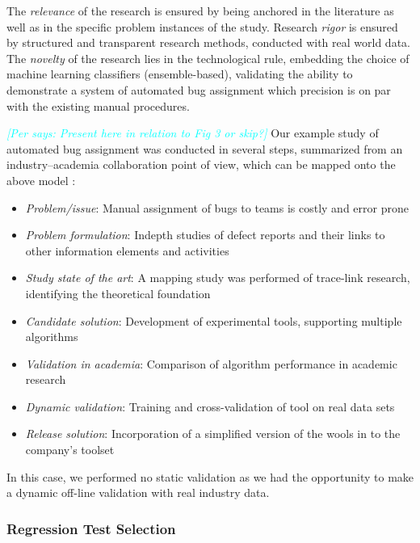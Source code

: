 \documentclass[graybox]{svmult}
\newcommand{\per}[1]{\textcolor{cyan}{{\it [Per says: #1]}}}
\newcommand{\per}[1]{}
\begin{document}
The \emph{relevance} of the research is ensured by being anchored in the literature as well as in the specific problem instances of the study. Research \emph{rigor} is ensured by structured and transparent research methods, conducted with real world data. The \emph{novelty} of the research lies in the technological rule, embedding the choice of machine learning classifiers (ensemble-based), validating the ability to demonstrate a system of automated bug assignment which precision is on par with the existing manual procedures.

\per{Present here in relation to Fig 3 or skip?}
Our example study of automated bug assignment was conducted in several steps, summarized from an industry--academia collaboration point of view, which can be mapped onto the above model \cite{CarverIEEESW2018}:
\begin{itemize}
\item \emph{Problem/issue}: Manual assignment of bugs to teams is costly and error prone
\item \emph{Problem formulation}: Indepth studies of defect reports and their links to other information elements and activities
\item \emph{Study state of the art}: A mapping study was performed of trace-link research, identifying the theoretical foundation \cite{Borg2013EMSE}
\item \emph{Candidate solution}: Development of experimental tools, supporting multiple algorithms
\item \emph{Validation in academia}: Comparison of algorithm performance in academic research \cite{BorgESEM13}
\item \emph{Dynamic validation}: Training and cross-validation of tool on real data sets \cite{JonssonBug15}
\item \emph{Release solution}: Incorporation of a simplified version of the wools in to the company's toolset
\end{itemize} 

In this case, we performed no static validation as we had the opportunity to make a dynamic off-line validation with real industry data.


\subsubsection{Regression Test Selection}
\end{document}
